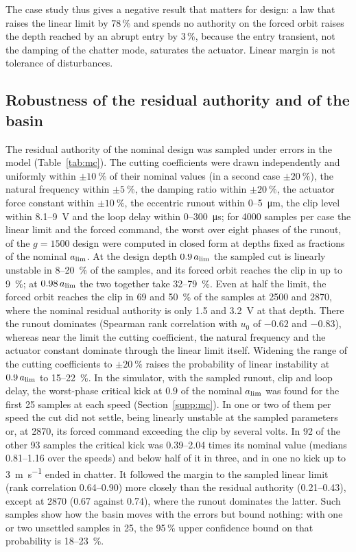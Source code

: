 The case study thus gives a negative result that matters for design: a law that raises the linear limit by 78\,\% and spends no authority on the forced orbit raises the depth reached by an abrupt entry by 3\,\%, because the entry transient, not the damping of the chatter mode, saturates the actuator. Linear margin is not tolerance of disturbances.

\subsection{Robustness of the residual authority and of the basin}\label{supp:std-delayed-robust}

The residual authority of the nominal design was sampled under errors in the model (Table~\ref{tab:mc}). The cutting coefficients were drawn independently and uniformly within $\pm\SI{10}{\percent}$ of their nominal values (in a second case $\pm\SI{20}{\percent}$), the natural frequency within $\pm\SI{5}{\percent}$, the damping ratio within $\pm\SI{20}{\percent}$, the actuator force constant within $\pm\SI{10}{\percent}$, the eccentric runout within 0--\SI{5}{\micro\metre}, the clip level within 8.1--\SI{9}{\volt} and the loop delay within 0--\SI{300}{\micro\second}; for 4000 samples per case the linear limit and the forced command, the worst over eight phases of the runout, of the $g=1500$ design were computed in closed form at depths fixed as fractions of the nominal $a_{\lim}$. At the design depth $0.9\,a_{\lim}$ the sampled cut is linearly unstable in 8--\SI{20}{\percent} of the samples, and its forced orbit reaches the clip in up to \SI{9}{\percent}; at $0.98\,a_{\lim}$ the two together take 32--\SI{79}{\percent}. Even at half the limit, the forced orbit reaches the clip in 69 and \SI{50}{\percent} of the samples at 2500 and \SI{2870}{\rpm}, where the nominal residual authority is only 1.5 and \SI{3.2}{\volt} at that depth. There the runout dominates (Spearman rank correlation with $u_0$ of $-0.62$ and $-0.83$), whereas near the limit the cutting coefficient, the natural frequency and the actuator constant dominate through the linear limit itself. Widening the range of the cutting coefficients to $\pm\SI{20}{\percent}$ raises the probability of linear instability at $0.9\,a_{\lim}$ to 15--\SI{22}{\percent}. In the simulator, with the sampled runout, clip and loop delay, the worst-phase critical kick at $0.9$ of the nominal $a_{\lim}$ was found for the first 25 samples at each speed (Section~\ref{supp:mc}). In one or two of them per speed the cut did not settle, being linearly unstable at the sampled parameters or, at \SI{2870}{\rpm}, its forced command exceeding the clip by several volts. In 92 of the other 93 samples the critical kick was 0.39--2.04 times its nominal value (medians 0.81--1.16 over the speeds) and below half of it in three, and in one no kick up to \SI{3}{\metre\per\second} ended in chatter. It followed the margin to the sampled linear limit (rank correlation 0.64--0.90) more closely than the residual authority (0.21--0.43), except at \SI{2870}{\rpm} (0.67 against 0.74), where the runout dominates the latter. Such samples show how the basin moves with the errors but bound nothing: with one or two unsettled samples in 25, the 95\,\% upper confidence bound on that probability is 18--\SI{23}{\percent}.
